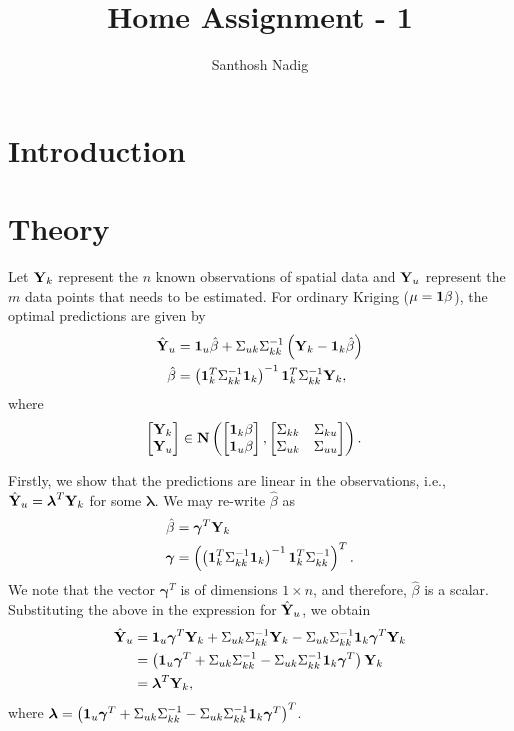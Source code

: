 \documentclass[a4paper,10pt]{article}
\title{Home Assignment - 1}
\author{Santhosh Nadig}
\def\bY{{\bf Y}}
\def\b1{{\bf 1}}
\def\blambda{{\boldsymbol \lambda}}
\def\bgamma{{\boldsymbol \gamma}}
\begin{document}
\maketitle

\section{Introduction}

\section{Theory}
Let $\bY_k$ represent the $n$ known observations of spatial data and $\bY_u$ represent the $m$ data points that needs to be estimated. For ordinary Kriging ($\mu = \b1 \beta$), the optimal predictions are given by
\begin{align*}
 \hat \bY_u &= \b1_u \hat \beta + \Sigma_{uk} \Sigma_{kk}^{-1}\left( \bY_k - \b1_k \hat \beta \right) \\
 \hat \beta &= \left( \b1_k^T \Sigma_{kk}^{-1} \b1_k \right)^{-1} \b1_k^T \Sigma_{kk}^{-1} \bY_k,
\end{align*}
where
\begin{align*}
 &\begin{bmatrix}
  \bY_k \\
  \bY_u
 \end{bmatrix} \in
 \mathbf{N} \left( 
 \begin{bmatrix}
    \b1_k \beta \\
   \b1_u \beta
  \end{bmatrix},
  \begin{bmatrix}
   \Sigma_{kk} & \Sigma_{ku} \\
   \Sigma_{uk} & \Sigma_{uu}
  \end{bmatrix}
  \right).
\end{align*}

Firstly, we show that the predictions are linear in the observations, i.e., $\hat \bY_u = \blambda^T \bY_k$ for some $\blambda$. We may re-write $\hat \beta$ as
\begin{align*}
 \hat \beta &= \bgamma^T \bY_k \\
 \bgamma &= \left( \left( \b1_k^T \Sigma_{kk}^{-1} \b1_k \right)^{-1} \b1_k^T \Sigma_{kk}^{-1} \right)^T.
\end{align*}
We note that the vector $\bgamma^T$ is of dimensions $1 \times n$, and therefore, $\hat \beta$ is a scalar. Substituting the above in the expression for $\hat \bY_u$, we obtain
\begin{align*}
 \hat \bY_u &= \b1_u \bgamma^T \bY_k + \Sigma_{uk} \Sigma_{kk}^{-1} \bY_k -  \Sigma_{uk} \Sigma_{kk}^{-1}  \b1_k \bgamma^T \bY_k \\
      &= \left( \b1_u \bgamma^T + \Sigma_{uk} \Sigma_{kk}^{-1} -  \Sigma_{uk} \Sigma_{kk}^{-1}  \b1_k \bgamma^T \right) \bY_k \\
      &= \blambda^T \bY_k,
\end{align*}
where $\blambda = \left( \b1_u \bgamma^T + \Sigma_{uk} \Sigma_{kk}^{-1} -  \Sigma_{uk} \Sigma_{kk}^{-1}  \b1_k \bgamma^T \right)^T$.
\end{document}
